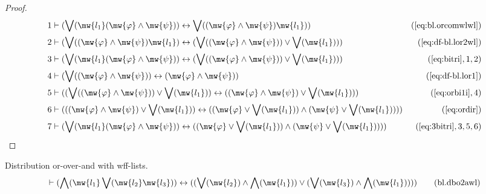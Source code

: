 \begin{proof}
\begin{align}
  1 & \vdash ( \bigvee( \mw{l_1} ( \mw{\varphi} \wedge \mw{\psi} ) ) \leftrightarrow
    \bigvee( ( \mw{\varphi} \wedge \mw{\psi} ) \mw{l_1} )
    )&(\mbox{\ref{eq:bl.orcomwlwl}})\notag
  \\ 2 & \vdash ( \bigvee( ( \mw{\varphi} \wedge \mw{\psi} ) \mw{l_1} )
    \leftrightarrow ( \bigvee( ( \mw{\varphi} \wedge \mw{\psi} ) )
    \vee \bigvee( \mw{l_1} ) )
    )&(\mbox{\ref{eq:df-bl.lor2wl}})\notag
  \\ 3 & \vdash ( \bigvee( \mw{l_1} ( \mw{\varphi} \wedge \mw{\psi} ) )
    \leftrightarrow ( \bigvee( ( \mw{\varphi} \wedge \mw{\psi} ) )
    \vee \bigvee( \mw{l_1} ) )
    )&(\mbox{\ref{eq:bitri}},1,2)\notag
  \\ 4 & \vdash ( \bigvee( ( \mw{\varphi} \wedge \mw{\psi} ) ) \leftrightarrow (
    \mw{\varphi} \wedge \mw{\psi} )
    )&(\mbox{\ref{eq:df-bl.lor1}})\notag
  \\ 5 & \vdash ( ( \bigvee( ( \mw{\varphi} \wedge \mw{\psi} ) ) \vee \bigvee(
    \mw{l_1} ) ) \leftrightarrow ( ( \mw{\varphi} \wedge \mw{\psi}
    ) \vee \bigvee( \mw{l_1} ) )
    )&(\mbox{\ref{eq:orbi1i}},4)\notag
  \\ 6 & \vdash ( ( ( \mw{\varphi} \wedge \mw{\psi} ) \vee \bigvee( \mw{l_1} ) )
    \leftrightarrow ( ( \mw{\varphi} \vee \bigvee( \mw{l_1} )
    ) \wedge ( \mw{\psi} \vee \bigvee( \mw{l_1} ) ) )
    )&(\mbox{\ref{eq:ordir}})\notag
  \\ 7 & \vdash ( \bigvee( \mw{l_1} ( \mw{\varphi} \wedge \mw{\psi} ) )
    \leftrightarrow ( ( \mw{\varphi} \vee \bigvee( \mw{l_1} )
    ) \wedge ( \mw{\psi} \vee \bigvee( \mw{l_1} ) ) )
    )&(\mbox{\ref{eq:3bitri}},3,5,6)\notag
\end{align}
\end{proof}

\begin{lemma} Distribution or-over-and with wff-lists.
\begin{align}
\vdash ( \bigwedge( \mw{l_1} \bigvee( \mw{l_2} \mw{l_3} ) ) \leftrightarrow ( (
    \bigvee( \mw{l_2} ) \wedge \bigwedge( \mw{l_1} ) ) \vee ( \bigvee( \mw{l_3}
    ) \wedge \bigwedge( \mw{l_1} ) ) ) )\label{eq:bl.dbo2awl}\tag{bl.dbo2awl}
\end{align}
\end{lemma}

